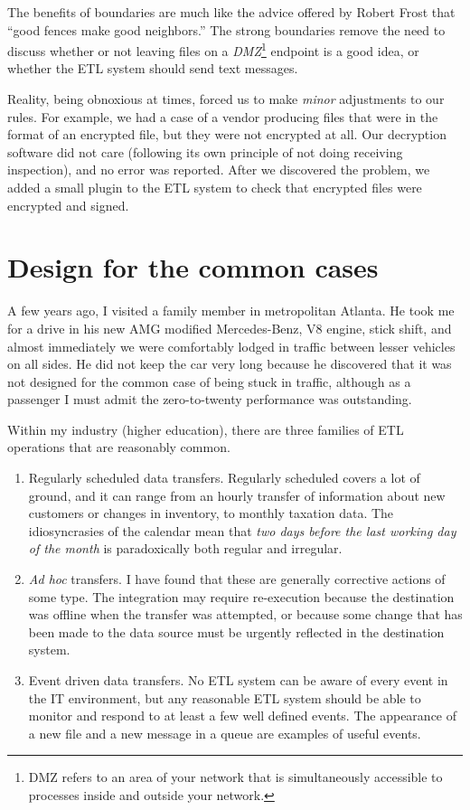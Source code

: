 \documentclass[11pt,letterpaper,twosided]{memoir}
\begin{document}
The benefits of boundaries are much like the advice offered by
Robert Frost that ``good fences make good neighbors.'' The strong
boundaries remove the need to discuss whether or not leaving files
on a \emph{DMZ}\footnote{DMZ refers to an area of your network that
is simultaneously accessible to processes inside and outside your
network.} endpoint is a good idea, or whether the ETL system should
send text messages.

Reality, being obnoxious at times, forced us to make \emph{minor}
adjustments to our rules. For example, we had a case of a vendor
producing files that were in the format of an encrypted file, but
they were not encrypted at all.  Our decryption software did not
care (following its own principle of not doing receiving inspection),
and no error was reported. After we discovered the problem, we added
a small plugin to the ETL system to check that encrypted files were
encrypted and signed.

\section{Design for the common cases}

A few years ago, I visited a family member in metropolitan Atlanta.
He took me for a drive in his new AMG modified Mercedes-Benz, V8
engine, stick shift, and almost immediately we were comfortably
lodged in traffic between lesser vehicles on all sides. He did not
keep the car very long because he discovered that it was not designed
for the common case of being stuck in traffic, although as a passenger
I must admit the zero-to-twenty performance was outstanding.

Within my industry (higher education), there are three families of
ETL operations that are reasonably common.

\begin{enumerate}
\item Regularly scheduled data transfers. Regularly scheduled covers
a lot of ground, and it can range from an hourly transfer of information
about new customers or changes in inventory, to monthly taxation
data. The idiosyncrasies of the calendar mean that \emph{two days
before the last working day of the month} is paradoxically both regular
and irregular.

\item \emph{Ad hoc} transfers. I have found that these are generally
corrective actions of some type. The integration may require re-execution
because the destination was offline when the transfer was attempted,
or because some change that has been made to the data source must
be urgently reflected in the destination system.

\item Event driven data transfers. No ETL system can be aware of every
event in the IT environment, but any reasonable ETL system should 
be able to monitor and respond to at least a few well defined events. 
The appearance of a new file and a new message in a queue are examples
of useful events.

\end{enumerate}
\end{document}
